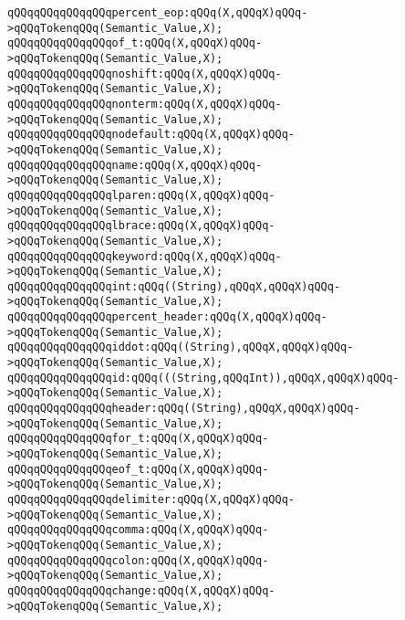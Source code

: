 \verb|qQQqqQQqqQQqqQQqpercent_eop:qQQq(X,qQQqX)qQQq->qQQqTokenqQQq(Semantic_Value,X);|\newline
\verb|qQQqqQQqqQQqqQQqof_t:qQQq(X,qQQqX)qQQq->qQQqTokenqQQq(Semantic_Value,X);|\newline
\verb|qQQqqQQqqQQqqQQqnoshift:qQQq(X,qQQqX)qQQq->qQQqTokenqQQq(Semantic_Value,X);|\newline
\verb|qQQqqQQqqQQqqQQqnonterm:qQQq(X,qQQqX)qQQq->qQQqTokenqQQq(Semantic_Value,X);|\newline
\verb|qQQqqQQqqQQqqQQqnodefault:qQQq(X,qQQqX)qQQq->qQQqTokenqQQq(Semantic_Value,X);|\newline
\verb|qQQqqQQqqQQqqQQqname:qQQq(X,qQQqX)qQQq->qQQqTokenqQQq(Semantic_Value,X);|\newline
\verb|qQQqqQQqqQQqqQQqlparen:qQQq(X,qQQqX)qQQq->qQQqTokenqQQq(Semantic_Value,X);|\newline
\verb|qQQqqQQqqQQqqQQqlbrace:qQQq(X,qQQqX)qQQq->qQQqTokenqQQq(Semantic_Value,X);|\newline
\verb|qQQqqQQqqQQqqQQqkeyword:qQQq(X,qQQqX)qQQq->qQQqTokenqQQq(Semantic_Value,X);|\newline
\verb|qQQqqQQqqQQqqQQqint:qQQq((String),qQQqX,qQQqX)qQQq->qQQqTokenqQQq(Semantic_Value,X);|\newline
\verb|qQQqqQQqqQQqqQQqpercent_header:qQQq(X,qQQqX)qQQq->qQQqTokenqQQq(Semantic_Value,X);|\newline
\verb|qQQqqQQqqQQqqQQqiddot:qQQq((String),qQQqX,qQQqX)qQQq->qQQqTokenqQQq(Semantic_Value,X);|\newline
\verb|qQQqqQQqqQQqqQQqid:qQQq(((String,qQQqInt)),qQQqX,qQQqX)qQQq->qQQqTokenqQQq(Semantic_Value,X);|\newline
\verb|qQQqqQQqqQQqqQQqheader:qQQq((String),qQQqX,qQQqX)qQQq->qQQqTokenqQQq(Semantic_Value,X);|\newline
\verb|qQQqqQQqqQQqqQQqfor_t:qQQq(X,qQQqX)qQQq->qQQqTokenqQQq(Semantic_Value,X);|\newline
\verb|qQQqqQQqqQQqqQQqeof_t:qQQq(X,qQQqX)qQQq->qQQqTokenqQQq(Semantic_Value,X);|\newline
\verb|qQQqqQQqqQQqqQQqdelimiter:qQQq(X,qQQqX)qQQq->qQQqTokenqQQq(Semantic_Value,X);|\newline
\verb|qQQqqQQqqQQqqQQqcomma:qQQq(X,qQQqX)qQQq->qQQqTokenqQQq(Semantic_Value,X);|\newline
\verb|qQQqqQQqqQQqqQQqcolon:qQQq(X,qQQqX)qQQq->qQQqTokenqQQq(Semantic_Value,X);|\newline
\verb|qQQqqQQqqQQqqQQqchange:qQQq(X,qQQqX)qQQq->qQQqTokenqQQq(Semantic_Value,X);|\newline
